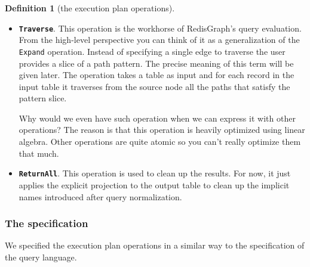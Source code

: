 \documentclass[14pt]{constructor-thesis}
\theoremstyle{definition}
\newtheorem*{definition}{Definition}
\begin{document}
\begin{definition}[the execution plan operations]
\begin{itemize}
    \item \textbf{\texttt{Traverse}}. This operation is the workhorse of RedisGraph's query evaluation. From the high-level perspective you can think of it as a generalization of the \texttt{Expand} operation. Instead of specifying a single edge to traverse the user provides a slice of a path pattern. The precise meaning of this term will be given later. The operation takes a table as input and for each record in the input table it traverses from the source node all the paths that satisfy the pattern slice.
    
    Why would we even have such operation when we can express it with other operations? The reason is that this operation is heavily optimized using linear algebra. Other operations are quite atomic so you can't really optimize them that much.

    \item \textbf{\texttt{ReturnAll}}. This operation is used to clean up the results. For now, it just applies the explicit projection to the output table to clean up the implicit names introduced after query normalization.
    
  \end{itemize}
\end{definition}

\subsubsection*{The specification}

We specified the execution plan operations in a similar way to the specification of the query language.
\end{document}
